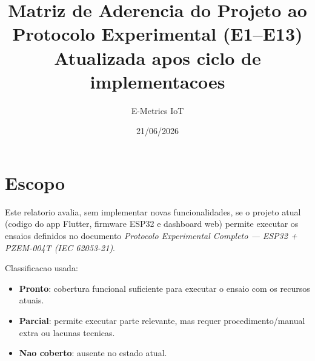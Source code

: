 \documentclass[11pt,a4paper]{article}
\title{Matriz de Aderencia do Projeto ao Protocolo Experimental (E1--E13)\\
\large Atualizada apos ciclo de implementacoes}
\author{E-Metrics IoT}
\date{21/06/2026}
\begin{document}
\maketitle

\section*{Escopo}
Este relatorio avalia, sem implementar novas funcionalidades, se o projeto atual
(codigo do app Flutter, firmware ESP32 e dashboard web) permite executar os ensaios
definidos no documento \textit{Protocolo Experimental Completo --- ESP32 + PZEM-004T (IEC 62053-21)}.

Classificacao usada:
\begin{itemize}
  \item \textbf{Pronto}: cobertura funcional suficiente para executar o ensaio com os recursos atuais.
  \item \textbf{Parcial}: permite executar parte relevante, mas requer procedimento/manual extra ou lacunas tecnicas.
  \item \textbf{Nao coberto}: ausente no estado atual.
\end{itemize}
\end{document}
